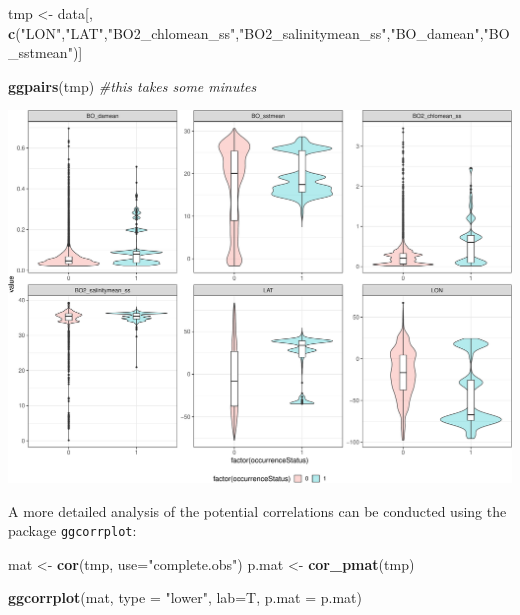 \documentclass[
]{book}
\newenvironment{Shaded}{\begin{snugshade}}{\end{snugshade}}
\newcommand{\AttributeTok}[1]{\textcolor[rgb]{0.13,0.29,0.53}{#1}}
\newcommand{\CommentTok}[1]{\textcolor[rgb]{0.56,0.35,0.01}{\textit{#1}}}
\newcommand{\FunctionTok}[1]{\textcolor[rgb]{0.13,0.29,0.53}{\textbf{#1}}}
\newcommand{\NormalTok}[1]{#1}
\newcommand{\OtherTok}[1]{\textcolor[rgb]{0.56,0.35,0.01}{#1}}
\newcommand{\StringTok}[1]{\textcolor[rgb]{0.31,0.60,0.02}{#1}}
\begin{document}
\begin{Shaded}
\begin{Highlighting}[]
\NormalTok{tmp }\OtherTok{\textless{}{-}}\NormalTok{ data[, }\FunctionTok{c}\NormalTok{(}\StringTok{"LON"}\NormalTok{,}\StringTok{"LAT"}\NormalTok{,}\StringTok{"BO2\_chlomean\_ss"}\NormalTok{,}\StringTok{"BO2\_salinitymean\_ss"}\NormalTok{,}\StringTok{"BO\_damean"}\NormalTok{,}\StringTok{"BO\_sstmean"}\NormalTok{)]}

\FunctionTok{ggpairs}\NormalTok{(tmp) }\CommentTok{\#this takes some minutes}
\end{Highlighting}
\end{Shaded}

\includegraphics{_main_files/figure-latex/unnamed-chunk-50-1.pdf}

A more detailed analysis of the potential correlations can be conducted using the package \texttt{ggcorrplot}:

\begin{Shaded}
\begin{Highlighting}[]
\NormalTok{mat }\OtherTok{\textless{}{-}} \FunctionTok{cor}\NormalTok{(tmp, }\AttributeTok{use=}\StringTok{"complete.obs"}\NormalTok{) }
\NormalTok{p.mat }\OtherTok{\textless{}{-}} \FunctionTok{cor\_pmat}\NormalTok{(tmp)}

\FunctionTok{ggcorrplot}\NormalTok{(mat, }\AttributeTok{type =} \StringTok{"lower"}\NormalTok{, }\AttributeTok{lab=}\NormalTok{T, }\AttributeTok{p.mat =}\NormalTok{ p.mat)}
\end{Highlighting}
\end{Shaded}
\end{document}
